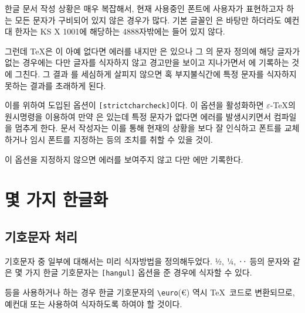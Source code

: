 한글 문서 작성 상황은 매우 복잡해서, 현재 사용중인 폰트에 사용자가
표현하고자 하는 모든 문자가 구비되어 있지 않은 경우가 많다. 기본 글꼴인
은 바탕만 하더라도 예컨대 한자는 KS X 1001에 해당하는 4888자밖에는
들어 있지 않다.

그런데 \TeX 은 이 아예 없다면 에러를 내지만 은
있으나 그 의 문자 정의에 해당 글자가 없는 경우에는
다만 글자를 식자하지 않고 경고만을 보이고 지나가면서 에 기록하는 것에
그친다. 그 결과 를 세심하게 살피지 않으면 혹 부지불식간에
특정 문자를 식자하지 못하는 결과를 초래하게 된다.

이를 위하여 도입된 옵션이 \texttt{[strictcharcheck]}이다.
이 옵션을 활성화하면 $\varepsilon$-\TeX 의 원시명령을 이용하여 만약 은
있는데 특정 문자가 없다면 에러를 발생시키면서 컴파일을 멈추게 한다.
문서 작성자는 이를 통해 현재의 상황을 보다 잘 인식하고 폰트를 교체하거나
임시 폰트를 지정하는 등의 조치를 취할 수 있을 것이\다. 

이 옵션을 지정하지 않으면 에러를 보여주지 않고 다만 에만
기록한다.

\section{몇 가지 한글화}

\subsection{기호문자 처리}
기호문자 중 일부에 대해서는 미리 식자방법을 정의해두었다.
½, ¼, ‥ 등의 문자와 같은 몇 가지 한글 기호문자는 \texttt{[hangul]} 옵션을
준 경우에 식자할 수 있다.

 등을 사용하거나 하는 경우 한글 기호문자의 \verb|\euro|(\euro) 역시
\TeX\ 코드로 변환되므로, 예컨대  또는 \를 사용하여
식자하도록 하여야 할 것이다.

